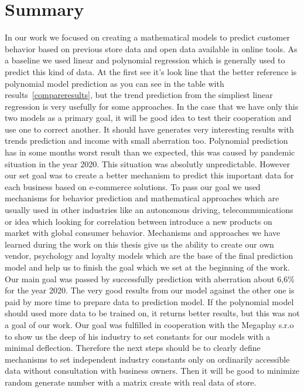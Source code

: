 
\chapter{Summary} \label{summary}
In our work we focused on creating a mathematical models to predict customer behavior based on previous store data and open data available in online tools.
As a baseline we used linear and polynomial regression which is generally used to predict this kind of data.
At the first see it's look line that the better reference is polynomial model prediction as you can see in the table with results~\ref{compareresults}, but the trend prediction from the simpliest
linear regression is very usefully for some approaches.
In the case that we have only this two models as a primary goal, it will be good idea to test their cooperation and use one to correct another.
It should have generates very interesting results with trends prediction and income with small aberration too.
Polynomial prediction has in some months worst result than we expected, this was caused by pandemic situation in the year 2020.
This situation was absolutly unpredictable.
However our set goal was to create a better mechanism to predict this important data for each business based on e-commerce solutions.
To pass our goal we used mechanisms for behavior prediction and mathematical approaches which are usually used in other industries like an autonomous driving,
telecommunications or idea which looking for correlation between introduce a new products on market with global consumer behavior.
Mechanisms and approaches we have learned during the work on this thesis give us the ability to create our own vendor, psychology and loyalty models which are the
base of the final prediction model and help us to finish the goal which we set at the beginning of the work.
Our main goal was passed by successfully prediction with aberration about 6,6\% for the year 2020.
The very good results from our model against the other one is paid by more time to prepare data to prediction model.
If the polynomial model should used more data to be trained on, it returns better results, but this was not a goal of our work.
Our goal was fulfilled in cooperation with the Megaplay s.r.o to show us the deep of his industry to set constants for our models with a minimal deflection.
Therefore the next steps should be to clearly define mechanisms to set independent industry constants only on ordinarily accessible data without consultation with business owners.
Then it will be good to minimize random generate number with a matrix create with real data of store.
